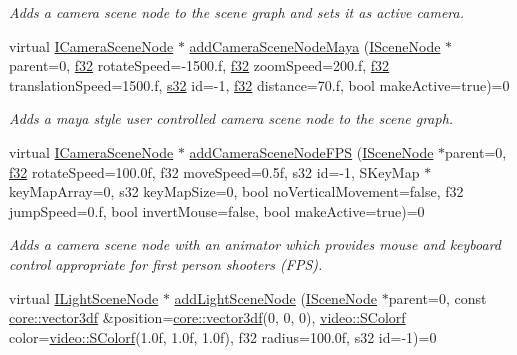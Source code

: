 \begin{DoxyCompactItemize}
\begin{DoxyCompactList}\small\item\em Adds a camera scene node to the scene graph and sets it as active camera. \end{DoxyCompactList}\item 
virtual \hyperlink{classirr_1_1scene_1_1ICameraSceneNode}{I\+Camera\+Scene\+Node} $\ast$ \hyperlink{classirr_1_1scene_1_1ISceneManager_a18e81a59e02231567ac938ea287fe523}{add\+Camera\+Scene\+Node\+Maya} (\hyperlink{classirr_1_1scene_1_1ISceneNode}{I\+Scene\+Node} $\ast$parent=0, \hyperlink{namespaceirr_a0277be98d67dc26ff93b1a6a1d086b07}{f32} rotate\+Speed=-\/1500.f, \hyperlink{namespaceirr_a0277be98d67dc26ff93b1a6a1d086b07}{f32} zoom\+Speed=200.f, \hyperlink{namespaceirr_a0277be98d67dc26ff93b1a6a1d086b07}{f32} translation\+Speed=1500.f, \hyperlink{namespaceirr_ac66849b7a6ed16e30ebede579f9b47c6}{s32} id=-\/1, \hyperlink{namespaceirr_a0277be98d67dc26ff93b1a6a1d086b07}{f32} distance=70.f, bool make\+Active=true)=0
\begin{DoxyCompactList}\small\item\em Adds a maya style user controlled camera scene node to the scene graph. \end{DoxyCompactList}\item 
virtual \hyperlink{classirr_1_1scene_1_1ICameraSceneNode}{I\+Camera\+Scene\+Node} $\ast$ \hyperlink{classirr_1_1scene_1_1ISceneManager_ac312cbc85161678d00192880f2cdddbb}{add\+Camera\+Scene\+Node\+F\+PS} (\hyperlink{classirr_1_1scene_1_1ISceneNode}{I\+Scene\+Node} $\ast$parent=0, \hyperlink{namespaceirr_a0277be98d67dc26ff93b1a6a1d086b07}{f32} rotate\+Speed=100.\+0f, f32 move\+Speed=0.\+5f, s32 id=-\/1, S\+Key\+Map $\ast$key\+Map\+Array=0, s32 key\+Map\+Size=0, bool no\+Vertical\+Movement=false, f32 jump\+Speed=0.\+f, bool invert\+Mouse=false, bool make\+Active=true)=0
\begin{DoxyCompactList}\small\item\em Adds a camera scene node with an animator which provides mouse and keyboard control appropriate for first person shooters (F\+PS). \end{DoxyCompactList}\item 
virtual \hyperlink{classirr_1_1scene_1_1ILightSceneNode}{I\+Light\+Scene\+Node} $\ast$ \hyperlink{classirr_1_1scene_1_1ISceneManager_a2e6442f8c95a544c355bd137ccdb7095}{add\+Light\+Scene\+Node} (\hyperlink{classirr_1_1scene_1_1ISceneNode}{I\+Scene\+Node} $\ast$parent=0, const \hyperlink{namespaceirr_1_1core_ae6e2b2a6c552833ebbd5b7463d03586b}{core\+::vector3df} \&position=\hyperlink{namespaceirr_1_1core_ae6e2b2a6c552833ebbd5b7463d03586b}{core\+::vector3df}(0, 0, 0), \hyperlink{classirr_1_1video_1_1SColorf}{video\+::\+S\+Colorf} color=\hyperlink{classirr_1_1video_1_1SColorf}{video\+::\+S\+Colorf}(1.\+0f, 1.\+0f, 1.\+0f), f32 radius=100.\+0f, s32 id=-\/1)=0

\end{DoxyCompactItemize}
